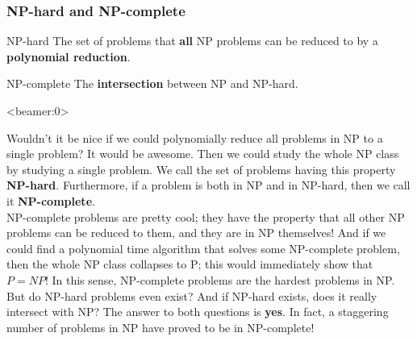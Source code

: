 \documentclass[handout, 12pt]{beamer}
\begin{document}
\begin{frame}

\frametitle{NP-hard and NP-complete}

\pause
\begin{block}{NP-hard}
The set of problems that \textbf{all} NP problems can be reduced to by a \textbf{polynomial reduction}.
\end{block}

\pause
\vspace{2em}
\begin{block}{NP-complete}
The \textbf{intersection} between NP and NP-hard.
\end{block}

\end{frame}

\begin{frame}<beamer:0>

\footnotesize
Wouldn't it be nice if we could polynomially reduce all problems in NP to a single problem? It would be awesome. Then we could study the whole NP class by studying a single problem. We call the set of problems having this property \textbf{NP-hard}. Furthermore, if a problem is both in NP and in NP-hard, then we call it \textbf{NP-complete}.
\\[0.6em]
NP-complete problems are pretty cool; they have the property that all other NP problems can be reduced to them, and they are in NP themselves! And if we could find a polynomial time algorithm that solves some NP-complete problem, then the whole NP class collapses to P; this would immediately show that $P=NP$! In this sense, NP-complete problems are the hardest problems in NP.
\\[0.6em]
But do NP-hard problems even exist? And if NP-hard exists, does it really intersect with NP? The answer to both questions is \textbf{yes}. In fact, a staggering number of problems in NP have proved to be in NP-complete! 

\end{frame}
\end{document}

